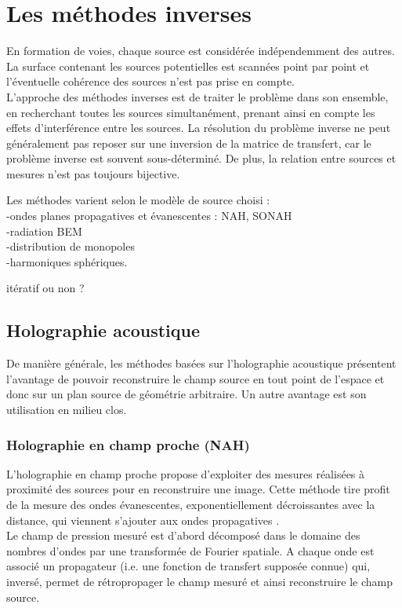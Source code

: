 \section{Les méthodes inverses}
En formation de voies, chaque source est considérée indépendemment des autres. La surface contenant les sources potentielles est scannées point par point et l'éventuelle cohérence des sources n'est pas prise en compte.\\

L'approche des méthodes inverses est de traiter le problème dans son ensemble, en recherchant toutes les sources simultanément, prenant ainsi en compte les effets d'interférence entre les sources.  La résolution du problème inverse ne peut généralement pas reposer sur une inversion de la matrice de transfert, car le problème inverse est souvent sous-déterminé. De plus, la relation entre sources et mesures n'est pas toujours bijective.

Les méthodes varient selon le modèle de source choisi : \\
-ondes planes propagatives et évanescentes : NAH, SONAH\\
-radiation BEM\\
-distribution de monopoles\\
-harmoniques sphériques.
 

itératif ou non ?


\subsection{Holographie acoustique}
De manière générale, les méthodes basées sur l'holographie acoustique présentent l'avantage de pouvoir reconstruire le champ source en tout point de l'espace et donc sur un plan source de géométrie arbitraire. Un autre avantage est son utilisation en milieu clos.
\subsubsection{Holographie en champ proche (NAH)}
L'holographie en champ proche propose d'exploiter des mesures réalisées à proximité des sources pour en reconstruire une image. Cette méthode tire profit de la mesure des ondes évanescentes, exponentiellement décroissantes avec la distance, qui viennent s'ajouter aux ondes propagatives \cite{Maynard1985}.\\
Le champ de pression mesuré est d'abord décomposé dans le domaine des nombres d'ondes par une transformée de Fourier spatiale. A chaque onde est associé un propagateur (i.e. une fonction de transfert supposée connue) qui, inversé, permet de rétropropager le champ mesuré et ainsi reconstruire le champ source. \\

